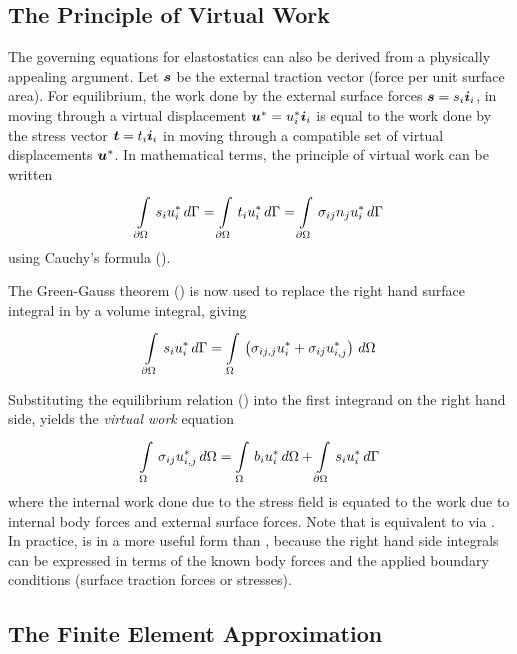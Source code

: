 \subsection{The Principle of Virtual Work}

The governing equations for elastostatics can also be derived from a
physically appealing argument. Let $\vect{s}$ be the external traction vector
(\ie force per unit surface area).  For equilibrium, the work done by the
external surface forces $\vect{s} = s_{i}\vect{i}_{i}$, in moving through a
virtual displacement $\vect{u}^{*} = u_{i}^{*}\vect{i}_{i}$ is equal to the
work done by the stress vector $\vect{t} = t_{i}\vect{i}_{i}$ in moving
through a compatible set of virtual displacements $\vect{u}^{*}$. In
mathematical terms, the principle of virtual work can be written
\begin{equation}
    \displaystyle\int\limits_{\partial \Omega}^{} \,s_{i} u_{i}^{*}\,d\Gamma  =   \displaystyle\int\limits_{\partial \Omega}^{} \,t_{i} u_{i}^{*}\,d\Gamma  
  =   \displaystyle\int\limits_{\partial \Omega}^{} \,\sigma_{ij}n_{j} u_{i}^{*}\,d\Gamma 
  \label{eqn:virtwork1}
\end{equation}
using Cauchy's formula ().

The Green-Gauss theorem () is now used to replace the
right hand surface integral in  by a volume integral,
giving
\begin{equation}
    \displaystyle\int\limits_{\partial \Omega}^{} \,s_{i} u_{i}^{*}\,d\Gamma  =    \displaystyle\int\limits_{\Omega}^{} \,\left( 
  \sigma_{ij,j} u_{i}^{*} + \sigma_{ij} u_{i,j}^{*}  \right)\,d\Omega  
\end{equation}

Substituting the equilibrium relation () into the first
integrand on the right hand side, yields the \emph{virtual work} equation
\begin{equation}
     \displaystyle\int\limits_{\Omega}^{} \,\sigma_{ij} u_{i,j}^{*}\,d\Omega   =    \displaystyle\int\limits_{\Omega}^{} \,b_{i}
  u_{i}^{*}\,d\Omega   +   \displaystyle\int\limits_{\partial \Omega}^{} \,s_{i} u_{i}^{*}\,d\Gamma 
  \label{eqn:virtwork2}
\end{equation}
where the internal work done due to the stress field is equated to the work
due to internal body forces and external surface forces.  Note that
 is equivalent to  via
. In practice,  is in a more
useful form than , because the right hand side integrals
can be expressed in terms of the known body forces and the applied boundary
conditions (surface traction forces or stresses).


\subsection{The Finite Element Approximation}


